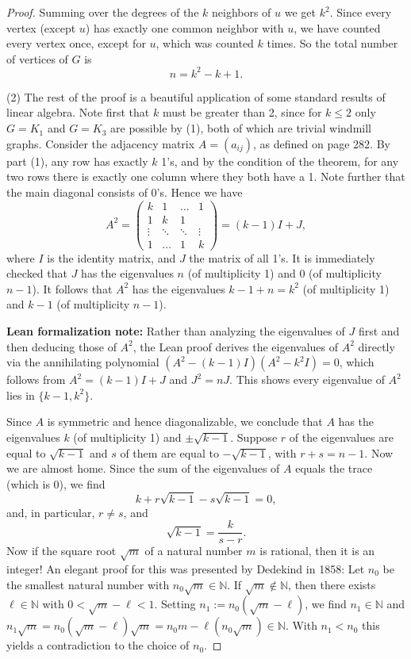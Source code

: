 \begin{proof}
Summing over the degrees of the $k$ neighbors of $u$ we get $k^2$. Since every vertex (except $u$)
has exactly one common neighbor with $u$, we have counted every vertex once, except for $u$,
which was counted $k$ times. So the total number of vertices of $G$ is
\[
n = k^2 - k + 1.
\]

(2) The rest of the proof is a beautiful application of some standard results of linear algebra.
Note first that $k$ must be greater than 2, since for $k \leq 2$ only $G = K_1$ and $G = K_3$
are possible by (1), both of which are trivial windmill graphs. Consider the adjacency
matrix $A = (a_{ij})$, as defined on page 282. By part (1), any row has exactly $k$ 1's,
and by the condition of the theorem, for any two rows there is exactly one column where they
both have a 1. Note further that the main diagonal consists of 0's. Hence we have
\[
A^2 = \begin{pmatrix}
k & 1 & \dots & 1 \\
1 & k & 1 \\
\vdots & \ddots & \ddots & \vdots \\
1 & \dots & 1 & k
\end{pmatrix} = (k - 1) I + J,
\]
where $I$ is the identity matrix, and $J$ the matrix of all 1's. It is immediately checked
that $J$ has the eigenvalues $n$ (of multiplicity 1) and $0$ (of multiplicity $n - 1$). It
follows that $A^2$ has the eigenvalues $k - 1 + n = k^2$ (of multiplicity 1) and $k - 1$
(of multiplicity $n - 1$).

\textbf{Lean formalization note:} Rather than analyzing the eigenvalues of $J$ first and then
deducing those of $A^2$, the Lean proof derives the eigenvalues of $A^2$ directly via the
annihilating polynomial $(A^2 - (k-1)I)(A^2 - k^2 I) = 0$, which follows from $A^2 = (k-1)I + J$
and $J^2 = nJ$. This shows every eigenvalue of $A^2$ lies in $\{k-1, k^2\}$.

Since $A$ is symmetric and hence diagonalizable, we conclude that $A$ has the eigenvalues $k$
(of multiplicity 1) and $\pm \sqrt{k - 1}$. Suppose $r$ of the eigenvalues are equal to
$\sqrt{k - 1}$ and $s$ of them are equal to $-\sqrt{k - 1}$, with $r + s = n - 1$.
Now we are almost home. Since the sum of the eigenvalues of $A$ equals the trace (which is 0),
we find
\[
k + r\sqrt{k - 1} - s\sqrt{k - 1} = 0,
\]
and, in particular, $r \neq s$, and
\[
\sqrt{k - 1} = \frac{k}{s - r}.
\]
Now if the square root $\sqrt{m}$ of a natural number $m$ is rational, then it is an integer!
An elegant proof for this was presented by Dedekind in 1858: Let $n_0$ be the smallest natural
number with $n_0 \sqrt{m} \in \mathbb{N}$. If $\sqrt{m} \not\in \mathbb{N}$, then there exists
$\ell \in \mathbb{N}$ with $0 < \sqrt{m} - \ell < 1$. Setting $n_1 := n_0(\sqrt{m} - \ell)$,
we find $n_1 \in \mathbb{N}$ and
$n_1 \sqrt{m} = n_0 (\sqrt{m} - \ell) \sqrt{m} = n_0 m - \ell (n_0 \sqrt{m}) \in \mathbb{N}$.
With $n_1 < n_0$ this yields a contradiction to the choice of $n_0$.


\end{proof}
